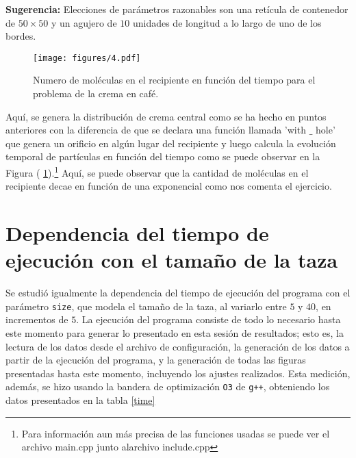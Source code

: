 \documentclass{article}
\begin{document}
    \textbf{Sugerencia:} Elecciones de parámetros razonables son una retícula de contenedor de $50 \times 50$ y un agujero de $10$ unidades de longitud a lo largo de uno de los bordes.

            \begin{figure}[h]
        \centering
        \texttt{[image: figures/4.pdf]}
        \caption{Numero de moléculas en el recipiente en función del tiempo para el problema de la crema en café.}
        \label{Graficapunto4}
    \end{figure}
    
     Aquí, se genera la distribución de crema central como se ha hecho en puntos anteriores con la diferencia de que se declara una función llamada 'with $\_$ hole' que genera un orificio en algún lugar del recipiente y luego calcula la evolución temporal de partículas en función del tiempo como se puede observar en la Figura (  \ref{Graficapunto4}).\footnote{Para información aun más precisa de las funciones usadas se puede ver el archivo main.cpp junto alarchivo include.cpp} Aquí, se puede observar que la cantidad de moléculas en el recipiente decae en función de una exponencial como nos comenta el ejercicio.

\section*{Dependencia del tiempo de ejecución con el tamaño de la taza}
Se estudió igualmente la dependencia del tiempo de ejecución del programa con el parámetro \texttt{size}, que modela el tamaño de la taza, al variarlo entre $5$ y $40$, en incrementos de $5$. La ejecución del programa consiste de todo lo necesario hasta este momento para generar lo presentado en esta sesión de resultados; esto es, la lectura de los datos desde el archivo de configuración, la generación de los datos a partir de la ejecución del programa, y la generación de todas las figuras presentadas hasta este momento, incluyendo los ajustes realizados. Esta medición, además, se hizo usando la bandera de optimización \texttt{O3} de \texttt{g++}, obteniendo los datos presentados en la tabla \ref{time}
\end{document}

